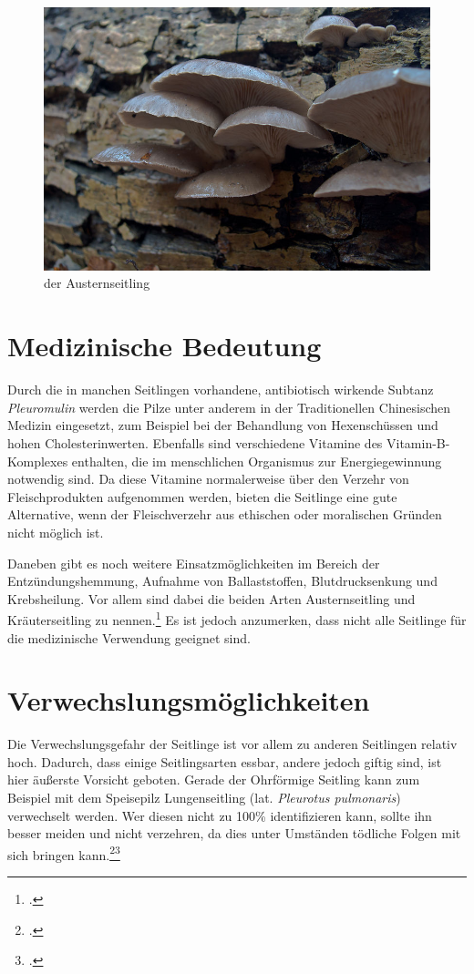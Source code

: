\documentclass[a4paper,abstracton]{scrreprt}
\begin{document}
\begin{figure}[H]
\centering
\includegraphics[scale=0.6]{auster2}
\caption{der Austernseitling\protect\footnotemark}
\label{fig:austernseitling}
\end{figure}

\section{Medizinische Bedeutung}
Durch die in manchen Seitlingen vorhandene, antibiotisch wirkende Subtanz \emph{Pleuromulin} werden die Pilze unter anderem in der Traditionellen Chinesischen Medizin eingesetzt, zum Beispiel bei der Behandlung von Hexenschüssen und hohen Cholesterinwerten. Ebenfalls sind verschiedene Vitamine des Vitamin-B-Komplexes enthalten, die im menschlichen Organismus zur Energiegewinnung notwendig sind. Da diese Vitamine normalerweise über den Verzehr von Fleischprodukten aufgenommen werden, bieten die Seitlinge eine gute Alternative, wenn der Fleischverzehr aus ethischen oder moralischen Gründen nicht möglich ist. 

Daneben gibt es noch weitere Einsatzmöglichkeiten im Bereich der Entzündungshemmung, Aufnahme von Ballaststoffen, Blutdrucksenkung und Krebsheilung.
Vor allem sind dabei die beiden Arten Austernseitling und Kräuterseitling zu nennen.\footcite{vital} Es ist jedoch anzumerken, dass nicht alle Seitlinge für die medizinische Verwendung geeignet sind.

\section{Verwechslungsmöglichkeiten}
Die Verwechslungsgefahr der Seitlinge ist vor allem zu anderen Seitlingen relativ hoch. Dadurch, dass einige Seitlingsarten essbar, andere jedoch giftig sind, ist hier äußerste Vorsicht geboten. Gerade der Ohrförmige Seitling kann zum Beispiel mit dem Speisepilz Lungenseitling (lat. \emph{Pleurotus pulmonaris}) verwechselt werden. Wer diesen nicht zu 100\% identifizieren kann, sollte ihn besser meiden und nicht verzehren, da dies unter Umständen tödliche Folgen mit sich bringen kann.\footcite{pg_ohrfoermig}\footcite{deutschlandradio}
\end{document}
